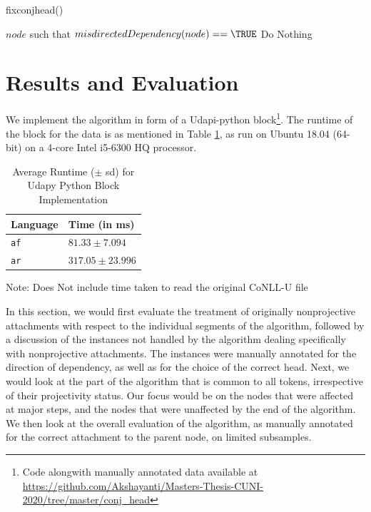 \begin{algorithm}[H]
\caption{fixconjhead()}
\label{conj-head-algo}
\begin{algorithmic}[1]
\REQUIRE $node$ such that $misdirectedDependency(node) == \TRUE$
            \STATE Do Nothing
        \ENDIF
    \ENDIF
\ENDIF
\STATE {}
    \RETURN 
{}
    \RETURN
{}
    \RETURN
\ELSE
    \RETURN
\ENDIF
\end{algorithmic}
\end{algorithm}

\section{Results and Evaluation}
\label{ssec:conj_head-results}

We implement the algorithm in form of a Udapi-python \citep{udapi} block\footnote{Code alongwith manually annotated data available at \url{https://github.com/Akshayanti/Masters-Thesis-CUNI-2020/tree/master/conj_head}}. The runtime of the block for the data is as mentioned in Table \ref{tab:conj-head-runtime}, as run on Ubuntu 18.04 (64-bit) on a 4-core Intel i5-6300 HQ processor.

\begin{table}[H]
    \centering
    \begin{tabular}{|l|l|}
        \hline
        \textbf{Language} & \textbf{Time (in ms)}\\
        \hline
        \verb|af| & \(81.33 \pm 7.094\) \\
        \verb|ar| & \(317.05 \pm 23.996\) \\
        \hline
    \end{tabular}
    \caption{Average Runtime (\(\pm\) sd) for Udapy Python Block Implementation}
    Note: Does Not include time taken to read the original CoNLL-U file
    \label{tab:conj-head-runtime}
\end{table}

In this section, we would first evaluate the treatment of originally nonprojective attachments with respect to the individual segments of the algorithm, followed by a discussion of the instances not handled by the algorithm dealing specifically with nonprojective attachments. The instances were manually annotated for the direction of dependency, as well as for the choice of the correct head. Next, we would look at the part of the algorithm that is common to all tokens, irrespective of their projectivity status. Our focus would be on the nodes that were affected at major steps, and the nodes that were unaffected by the end of the algorithm. We then look at the overall evaluation of the algorithm, as manually annotated for the correct attachment to the parent node, on limited subsamples.

